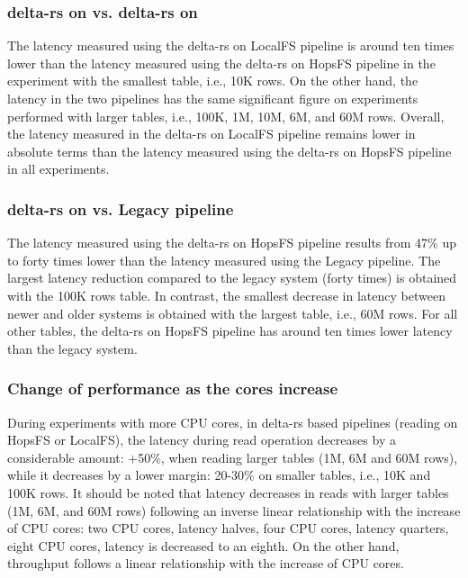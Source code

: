 \subsubsection*{delta-rs on  vs. delta-rs on }

The latency measured using the delta-rs on \gls{LocalFS} pipeline is around ten times lower than the latency measured using the delta-rs on \gls{HopsFS} pipeline in the experiment with the smallest table, i.e., 10K rows. On the other hand, the latency in the two pipelines has the same significant figure on experiments performed with larger tables, i.e., 100K, 1M, 10M, 6M, and 60M rows. Overall, the latency measured in the delta-rs on \gls{LocalFS} pipeline remains lower in absolute terms than the latency measured using the delta-rs on \gls{HopsFS} pipeline in all experiments.

\subsubsection*{delta-rs on  vs. Legacy pipeline}

The latency measured using the delta-rs on \gls{HopsFS} pipeline results from 47\% up to forty times lower than the latency measured using the Legacy pipeline. The largest latency reduction compared to the legacy system (forty times) is obtained with the 100K rows table. In contrast, the smallest decrease in latency between newer and older systems is obtained with the largest table, i.e., 60M rows. For all other tables, the delta-rs on \gls{HopsFS} pipeline has around ten times lower latency than the legacy system.

\subsubsection*{Change of performance as the  cores increase}

During experiments with more \gls{CPU} cores, in delta-rs based pipelines (reading on \gls{HopsFS} or \gls{LocalFS}), the latency during read operation decreases by a considerable amount: +50\%, when reading larger tables (1M, 6M and 60M rows), while it decreases by a lower margin: 20-30\% on smaller tables, i.e., 10K and 100K rows. It should be noted that latency decreases in reads with larger tables (1M, 6M, and 60M rows) following an inverse linear relationship with the increase of \gls{CPU} cores: two \gls{CPU} cores, latency halves, four \gls{CPU} cores, latency quarters, eight \gls{CPU} cores, latency is decreased to an eighth. On the other hand, throughput follows a linear relationship with the increase of \gls{CPU} cores.

